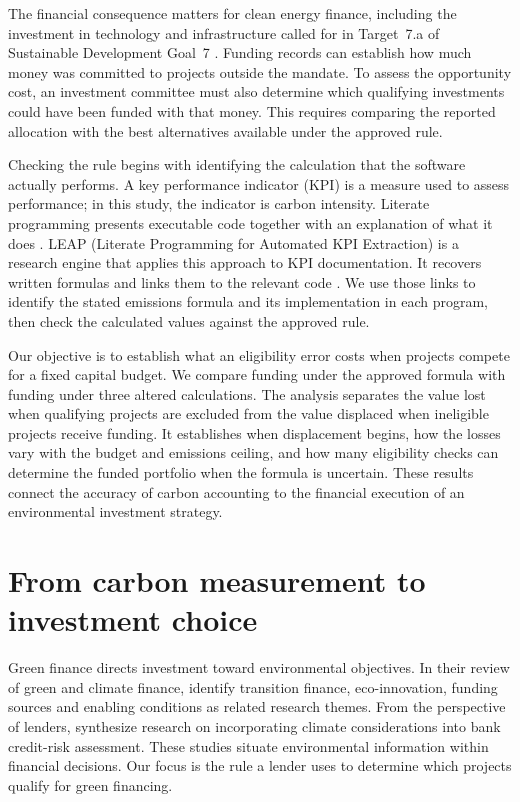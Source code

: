 The financial consequence matters for clean energy finance, including the investment in technology and infrastructure called for in Target~7.a of Sustainable Development Goal~7 \citep{un}. Funding records can establish how much money was committed to projects outside the mandate. To assess the opportunity cost, an investment committee must also determine which qualifying investments could have been funded with that money. This requires comparing the reported allocation with the best alternatives available under the approved rule.

Checking the rule begins with identifying the calculation that the software actually performs. A key performance indicator (KPI) is a measure used to assess performance; in this study, the indicator is carbon intensity. Literate programming presents executable code together with an explanation of what it does \citep{knuth}. LEAP (Literate Programming for Automated KPI Extraction) is a research engine that applies this approach to KPI documentation. It recovers written formulas and links them to the relevant code \citep{zenodo,leap}. We use those links to identify the stated emissions formula and its implementation in each program, then check the calculated values against the approved rule.

Our objective is to establish what an eligibility error costs when projects compete for a fixed capital budget. We compare funding under the approved formula with funding under three altered calculations. The analysis separates the value lost when qualifying projects are excluded from the value displaced when ineligible projects receive funding. It establishes when displacement begins, how the losses vary with the budget and emissions ceiling, and how many eligibility checks can determine the funded portfolio when the formula is uncertain. These results connect the accuracy of carbon accounting to the financial execution of an environmental investment strategy.

\section{From carbon measurement to investment choice}
Green finance directs investment toward environmental objectives. In their review of green and climate finance, \citet{joshipura2025} identify transition finance, eco-innovation, funding sources and enabling conditions as related research themes. From the perspective of lenders, \citet{raimondi2026} synthesize research on incorporating climate considerations into bank credit-risk assessment. These studies situate environmental information within financial decisions. Our focus is the rule a lender uses to determine which projects qualify for green financing.

